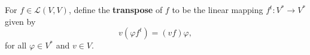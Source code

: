 For $f \in \mathcal{L}(V, V)$, define the \textbf{transpose} of $f$ to be the linear mapping $f^t \colon V^* \to V^*$ given by
$$v(\varphi f^t) = (vf)\varphi,$$
for all $\varphi \in V^*$ and $v \in V$.
